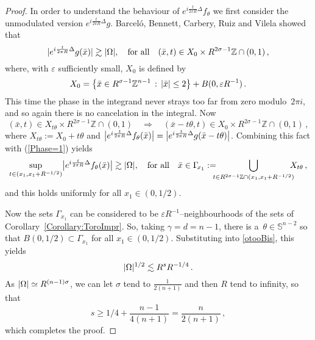\documentclass[biblatex]{pzorin-note}
\begin{document}
\begin{proof}
In order to understand the behaviour of $e^{i\frac{t}{2\pi R}\Delta} f_\theta$ we first consider the unmodulated version $e^{i\frac{t}{2\pi R}\Delta} g$.
Barcel\'o, Bennett, Carbery, Ruiz and Vilela \cite{BBCRV} showed that
\begin{equation}\label{Phase=1}
\abs{e^{i\frac{t}{2\pi R}\Delta} g(\bar{x})} \gtrsim \abs{\Omega},
\quad
\mbox{for all}
\quad
(\bar{x},t) \in X_0\times R^{2\sigma-1}\mathbb{Z}\cap(0,1) \, ,
\end{equation}
where, with $\varepsilon$ sufficiently small, $X_0$ is defined by
\begin{equation}\nonumber
X_0 = \big\{ \bar{x}\in R^{\sigma-1}\mathbb{Z}^{n-1}\,:\, \abs{\bar{x}}\le 2\big\}+ B(0,\varepsilon R^{-1}) \, .
\end{equation}
This time the phase in the integrand never strays too far from zero modulo~$2\pi i$, and so again there is no cancelation in the integral. Now
\begin{equation}\nonumber
(\bar{x},t)\in X_{t\theta} \times R^{2\sigma - 1} \mathbb{Z}\cap(0,1) \quad
\Rightarrow\quad (\bar{x}-t \theta,t) \in X_0\times R^{2\sigma-1}\mathbb{Z}\cap(0,1) \, ,
\end{equation}
where $X_{t\theta}:=X_0+t\theta$ and $
\abs[\big]{ e^{i\frac{t}{2\pi R}\Delta} f_\theta(\bar{x})}= \abs[\big]{ e^{i\frac{t}{2\pi R}\Delta} g(\bar{x} -t\theta )}
$.
Combining this fact with (\ref{Phase=1}) yields
\begin{equation*}\label{otooBisr}
\sup_{t\in(x_1,x_1+R^{-1/2})} \abs[\big]{ e^{i\frac{t}{2\pi R}\Delta} f_\theta(\bar{x})} \gtrsim \abs{\Omega},
\quad
\text{for all}\quad
\bar{x} \in \Gamma_{\!x_1} :=\!\!\!\!\bigcup_{t\in R^{2\sigma - 1} \mathbb{Z}\cap(x_1,x_1+ R^{-1/2})}\!\!\!\!X_{t\theta} \,,
\end{equation*} and this holds uniformly for all $x_1\in (0,1/2)$.

Now the sets $\Gamma_{\!x_1}$ can be considered to be $\varepsilon R^{-1}$--neighbourhoods of the sets of Corollary~\ref{Corollary:ToroImpr}. So, taking $\gamma=d=n-1$,
there is a~$\theta\in \mathbb{S}^{n-2}$ so that $B(0,1/2)\subset \Gamma_{\!x_1}$ for
all $x_1\in(0,1/2)$.
Substituting into \eqref{otooBis}, this yields
\[
\abs{\Omega}^{1/2} \lesssim R^sR^{-1/4} \, .
\]
As $\abs{\Omega}\simeq R^{(n-1)\sigma}$, we can let $\sigma$ tend to $\frac{1}{2(n+1)}$ and then $R$ tend to infinity, so that
\[
s\ge 1/4+\frac{n-1}{4(n+1)}=\frac{n}{2(n+1)} \, ,
\]
which completes the proof.
\end{proof}
\end{document}
